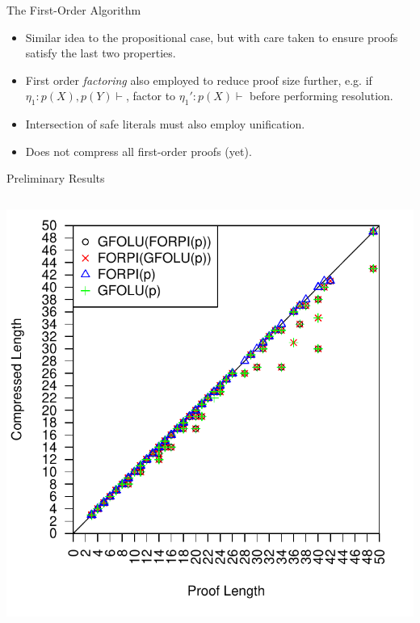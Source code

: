 \documentclass[final]{beamer} %
\begin{document}
\begin{frame}{}
\begin{columns}
  \begin{column}{0.3\textwidth}
      \vfill
\begin{block}{The First-Order Algorithm}
\begin{itemize}
\item Similar idea to the propositional case, but with care taken to ensure proofs satisfy the last two properties.
\item First order \emph{factoring} also employed to reduce proof size further, e.g. if $\eta_1: p(X), p(Y) \vdash$, factor to $\eta_1': p(X)\vdash$ before performing resolution.
\item Intersection of safe literals must also employ unification.
\item Does not compress all first-order proofs (yet).
\end{itemize}
\end{block}      
      \begin{block}{Preliminary Results}
      \begin{columns}
      \begin{column}{0.35\textwidth}
\includegraphics[scale=1]{images/everything-forpi-folu-length_vs_compress_length_all_proofs.pdf}\\

\end{column}
\end{columns}
\end{block}
\end{column}
\end{columns}
\end{frame}
\end{document}
